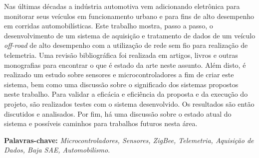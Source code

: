 

\noindent Nas últimas décadas a indústria automotiva vem adicionando eletrônica para monitorar seus veículos em funcionamento urbano e para fins de alto desempenho em corridas automobilísticas. Este trabalho mostra, passo a passo, o desenvolvimento de um sistema de aquisição e tratamento de dados de um veículo \textit{off-road} de alto desempenho com a utilização de rede sem fio para realização de telemetria. Uma revisão bibliográfica foi realizada em artigos, livros e outras monografias para encontrar o que é estado da arte neste assunto. Além disto, é realizado um estudo sobre sensores e microcontroladores a fim de criar este sistema, bem como uma discussão sobre o significado dos sistemas propostos neste trabalho. Para validar a eficácia e eficiência da proposta e da execução do projeto, são realizados testes com o sistema desenvolvido. Os resultados são então discutidos e analisados. Por fim, há uma discussão sobre o estado atual do sistema e possíveis caminhos para trabalhos futuros nesta área.



\textbf{Palavras-chave:} \textit{Microcontroladores, Sensores, ZigBee, Telemetria, Aquisição de Dados, Baja SAE, Automobilismo}.



